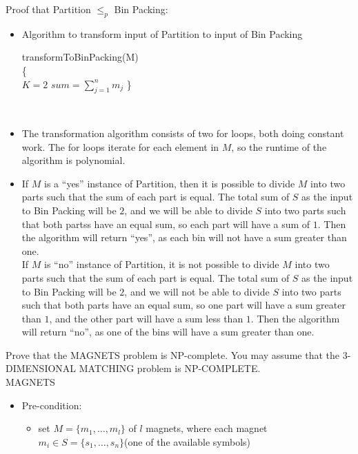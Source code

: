 \documentclass{assignment}
\begin{document}
\begin{problemlist}
\begin{answer}
\begin{itemize}
\end{itemize}
Proof that Partition $\le_p$ Bin Packing:
\begin{itemize}
\item Algorithm to transform input of Partition to input of Bin Packing
\IncMargin{3em}
\begin{algorithm}
  transformToBinPacking(M)\\\{\\
  \Indp
  $K = 2$\;
  $sum = \sum_{j=1}^n m_j$\;
  \;
  \Indm
  \}
\end{algorithm}
\DecMargin{3em}\\
\item The transformation algorithm consists of two for loops, both doing constant work. The for loops iterate for each element in $M$, so the runtime of the algorithm is polynomial.
\item If $M$ is a ``yes'' instance of Partition, then it is possible to divide $M$ into two parts such that the sum of each part is equal. The total sum of $S$ as the input to Bin Packing will be $2$, and we will be able to divide $S$ into two parts such that both partss have an equal sum, so each part will have a sum of $1$. Then the algorithm will return ``yes'', as each bin will not have a sum greater than one.\\
If $M$ is ``no'' instance of Partition, it is not possible to divide $M$ into two parts such that the sum of each part is equal. The total sum of $S$ as the input to Bin Packing will be $2$, and we will not be able to divide $S$ into two parts such that both parts have an equal sum, so one part will have a sum greater than $1$, and the other part will have a sum less than $1$. Then the algorithm will return ``no'', as one of the bins will have a sum greater than one.\\
\end{itemize}
\end{answer}
\clearpage
\pbitem
\begin{problem}
Prove that the  MAGNETS problem is NP-complete. You may assume that the 3-DIMENSIONAL MATCHING problem is NP-COMPLETE.\\
MAGNETS
\begin{itemize}
\item Pre-condition:
\begin{itemize}
\item set $M=\{m_1,\ldots,m_l\}$ of $l$ magnets, where each magnet $m_i\in S=\{s_1,\ldots,s_n\}$(one of the available symbols)

\end{itemize}
\end{itemize}
\end{problem}
\end{problemlist}
\end{document}
